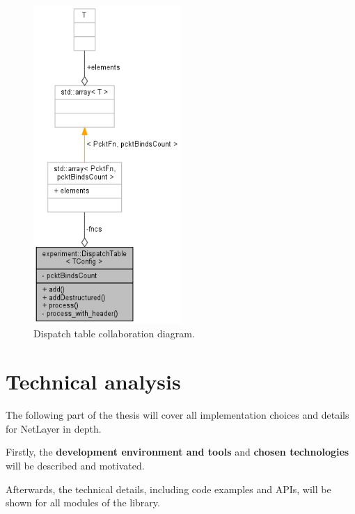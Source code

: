 \documentclass[11pt]{report}
\newcommand{\+}{\discretionary{\mbox{\scriptsize$\hookleftarrow$}}{}{}}
\renewcommand\emph{\textbf}
\begin{document}
                \begin{figure}[H]
                \caption{Dispatch table collaboration diagram.}
                \centering
                \includegraphics[width=0.5\textwidth]{d/coll/coll_disptab.png}
                \end{figure}

                \newpage                




\part{Technical analysis}
        The following part of the thesis will cover all implementation choices and details for NetLayer in depth.

        Firstly, the \emph{development environment and tools} and \emph{chosen technologies} will be described and motivated.

        Afterwards, the technical details, including code examples and APIs, will be shown for all modules of the library.
\end{document}
